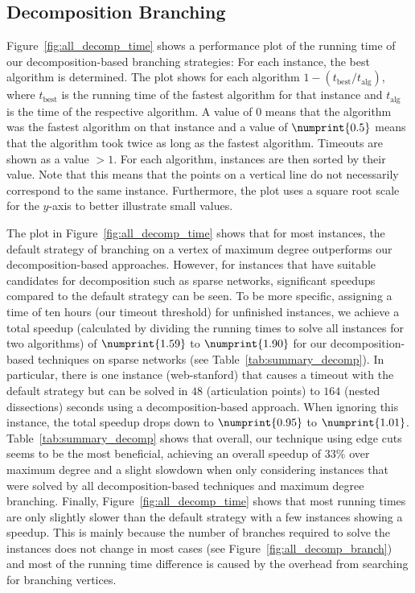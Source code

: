 \documentclass[a4paper,UKenglish,cleveref, autoref, thm-restate]{lipics-v2021}
\begin{document}
\subsection{Decomposition Branching}\label{sec:experiments_decomp}

Figure~\ref{fig:all_decomp_time} shows a performance plot of the running time of
our decomposition-based branching strategies: For each instance, the best
algorithm is determined. The plot shows for each algorithm $1 - (t_{\text{best}}/
t_{\text{alg}})$, where $t_{\text{best}}$ is the running time of the fastest algorithm
for that instance and $t_{\text{alg}}$ is the time of the respective algorithm.
A value of $0$ means that
the algorithm was the fastest algorithm on that instance and a value of
$\numprint{0.5}$ means that the algorithm took twice as long as the fastest
algorithm. Timeouts are shown as a value $> 1$. For each algorithm, instances
are then sorted by their value. Note that this means that the points on a
vertical line do not necessarily correspond to the same instance. Furthermore,
the plot uses a square root scale for the $y$-axis to better illustrate small values.

The plot in Figure~\ref{fig:all_decomp_time} shows that for most instances, the default strategy of branching on a
vertex of maximum degree outperforms our decomposition-based approaches.
However, for instances that have suitable candidates for decomposition such as
sparse networks, significant speedups compared to the default strategy can be
seen. To be more specific, assigning a time of ten hours (our timeout threshold) for unfinished
instances, we achieve a total speedup (calculated by dividing the running times
to solve all instances for two algorithms) of $\numprint{1.59}$ to $\numprint{1.90}$ for our
decomposition-based techniques on sparse networks (see
Table~\ref{tab:summary_decomp}). In particular, there is one instance (web-stanford) that causes a timeout with the
default strategy but can be solved in $48$ (articulation points) to $164$ (nested
dissections) seconds using a decomposition-based approach. When ignoring this instance, the total speedup drops down
to $\numprint{0.95}$ to $\numprint{1.01}$. Table~\ref{tab:summary_decomp} shows that overall, our
technique using edge cuts seems to be the most beneficial, achieving an overall
speedup of $33\%$ over maximum degree and a slight slowdown
when only considering instances that were solved by all decomposition-based
techniques and maximum degree branching.
Finally, Figure~\ref{fig:all_decomp_time} shows that most running
times are only slightly slower than the default strategy with a few instances
showing a speedup. This is mainly because
the number of branches required to solve the instances does not change in most
cases (see Figure~\ref{fig:all_decomp_branch}) and most of the running time
difference is caused by the overhead from
searching for branching vertices.%
\end{document}

